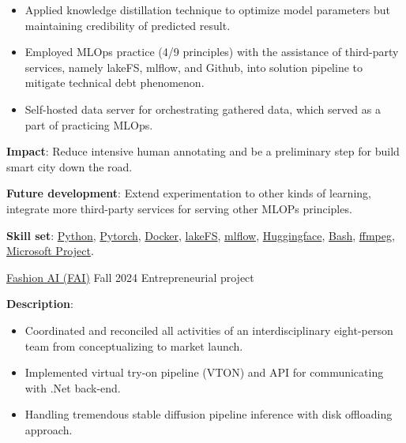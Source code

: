 \documentclass{src/preamble/doc_class}
\begin{document}
\begin{MainPart}
{\begin{itemize}[label=$\bullet$,topsep=-.5ex,itemsep=-0.5ex]
            	\item Applied knowledge distillation technique to optimize model parameters but maintaining credibility of predicted result.
            	
            	\item Employed MLOps practice (4/9 principles) with the assistance of third-party services, namely lakeFS, mlflow, and Github, into solution pipeline to mitigate technical debt phenomenon.
            	
            	\item Self-hosted data server for orchestrating gathered data, which served as a part of practicing MLOps.
            \end{itemize}
            \vspace{.15cm}
            
            \textbf{Impact}: Reduce intensive human annotating and be a preliminary step for build smart city down the road.
            \vspace{.15cm}
            
            \textbf{Future development}: Extend experimentation to other kinds of learning, integrate more third-party services for serving other MLOPs principles.
            \vspace{.1cm}

            \textbf{Skill set}: \href{https://www.python.org/}{Python}, \href{https://pytorch.org/}{Pytorch}, \href{https://www.docker.com/}{Docker}, \href{https://lakefs.io/}{lakeFS}, \href{https://mlflow.org/}{mlflow}, \href{https://huggingface.co/}{Huggingface}, \href{https://www.gnu.org/software/bash/}{Bash}, \href{https://ffmpeg.org/}{ffmpeg}, \href{https://www.microsoft.com/en/microsoft-365/planner/microsoft-planner?market=af}{Microsoft Project}.
        }
		
		\Experience
		{\ColorHighlight}
		{\href{https://fashion-ai-innovation.vercel.app/}{Fashion AI (FAI)}}
		{Fall 2024}
		{Entrepreneurial project}
		{
			\textbf{Description}:
			\begin{itemize}[label=$\bullet$,topsep=-.5ex,itemsep=-0.5ex]
				\item Coordinated and reconciled all activities of an interdisciplinary eight-person team from conceptualizing to market launch.
				
				\item Implemented virtual try-on pipeline (VTON) and API for communicating with .Net back-end.
				
				\item Handling tremendous stable diffusion pipeline inference with disk offloading approach.
			\end{itemize}
			\vspace{0.15cm}
			
}
\end{MainPart}
\end{document}
